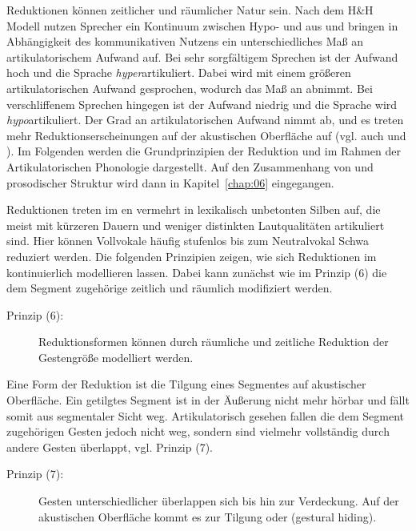 Reduktionen können zeitlicher und räumlicher Natur sein. Nach dem H\&H Modell \citep{Lindblom1990} nutzen Sprecher ein Kontinuum zwischen Hypo- und  aus und bringen in Abhängigkeit des kommunikativen Nutzens ein unterschiedliches Maß an artikulatorischem Aufwand auf. Bei sehr sorgfältigem Sprechen ist der Aufwand hoch und die Sprache \textit{hyper}artikuliert. Dabei wird mit einem größeren artikulatorischen Aufwand gesprochen, wodurch das Maß an  abnimmt. Bei verschliffenem Sprechen hingegen ist der Aufwand niedrig und die Sprache wird \textit{hypo}artikuliert. Der Grad an artikulatorischen Aufwand nimmt ab, und es treten mehr Reduktionserscheinungen auf der akustischen Oberfläche auf (vgl. auch \citealt{DeJong1993} und \citealt{Kröger1998}). Im Folgenden werden die Grundprinzipien der Reduktion und  im Rahmen der Artikulatorischen Phonologie dargestellt. Auf den Zusammenhang von  und prosodischer Struktur wird dann in Kapitel~\ref{chap:06} eingegangen.

Reduktionen treten im en vermehrt in lexikalisch unbetonten Silben auf, die meist mit kürzeren Dauern und weniger distinkten Lautqualitäten artikuliert sind. Hier können Vollvokale häufig stufenlos bis zum Neutralvokal Schwa reduziert werden. Die folgenden Prinzipien zeigen, wie sich Reduktionen im  kontinuierlich modellieren lassen. Dabei kann zunächst wie im Prinzip (6) die dem Segment zugehörige  zeitlich und räumlich modifiziert werden.

\begin{description}
	\item[Prinzip (6):] Reduktionsformen können durch räumliche und zeitliche Reduktion der Gestengröße modelliert werden.
\end{description}

Eine Form der Reduktion ist die Tilgung eines Segmentes auf akustischer Oberfläche. Ein getilgtes Segment ist in der Äußerung nicht mehr hörbar und fällt somit aus segmentaler Sicht weg. Artikulatorisch gesehen fallen die dem Segment zugehörigen Gesten jedoch nicht weg, sondern sind vielmehr vollständig durch andere Gesten überlappt, vgl. Prinzip (7). 

\begin{description}
	\item[Prinzip (7):] Gesten unterschiedlicher  überlappen sich bis hin zur Verdeckung. Auf der akustischen Oberfläche kommt es zur Tilgung oder  (gestural hiding).
\end{description}



